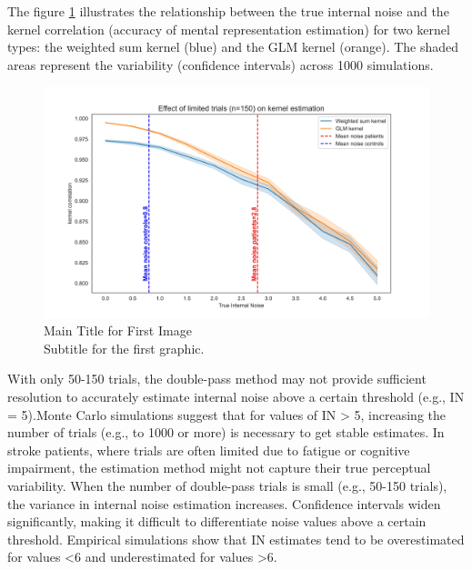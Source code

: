 The figure \ref{fig:kernel_150} illustrates the relationship between the true internal noise and the kernel correlation (accuracy of mental representation estimation) for two kernel types: the weighted sum kernel (blue) and the GLM kernel (orange). The shaded areas represent the variability (confidence intervals) across 1000 simulations.



\begin{figure}[ht!]
    \centering
    \includegraphics[width=15cm]{MainLayout/Images/chapter5/kernel_150.jpg}
    \caption{Main Title for First Image \\ \small Subtitle for the first graphic.}
    \label{fig:kernel_150}
\end{figure}
With only 50-150 trials, the double-pass method may not provide sufficient resolution to accurately estimate internal noise above a certain threshold (e.g., IN = 5).Monte Carlo simulations suggest that for values of IN > 5, increasing the number of trials (e.g., to 1000 or more) is necessary to get stable estimates.
In stroke patients, where trials are often limited due to fatigue or cognitive impairment, the estimation method might not capture their true perceptual variability.
When the number of double-pass trials is small (e.g., 50-150 trials), the variance in internal noise estimation increases.
Confidence intervals widen significantly, making it difficult to differentiate noise values above a certain threshold.
Empirical simulations show that IN estimates tend to be overestimated for values <6 and underestimated for values >6.
